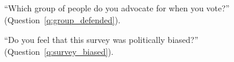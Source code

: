 \begin{figure}[h!]
    \caption[Moral circle]{``Which group of people do you advocate for when you vote?'' (Question~\ref{q:group_defended}).
    }\label{fig:group_defended_all}
\end{figure}


\begin{figure}[h!]
    \caption[Feeling that the survey was politically biased]{``Do you feel that this survey was politically biased?'' (Question~\ref{q:survey_biased}).
    }\label{fig:survey_biased}
\end{figure}

